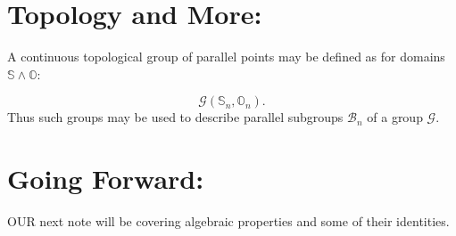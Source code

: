 \documentclass[10pt]{article}
\theoremstyle{plain}
\theoremstyle{definition}
\theoremstyle{remark}
\begin{document}
\section{Topology and More:}
A continuous topological group of parallel points may be defined as for domains $\mathbb{S} \land \mathbb{O}$:

\begin{equation}
	\mathcal{G}(\mathbb{S}_n, \mathbb{O}_n).
\end{equation}
Thus such groups may be used to describe parallel subgroups $\mathcal{B}_n$ of a group $\mathcal{G}$.

\section{Going Forward:}

\lettrine[lines=1, lhang=0.1, loversize=0.2]{O}UR next note will be covering algebraic properties and some of their identities.

\nocite{*}




\end{document}
